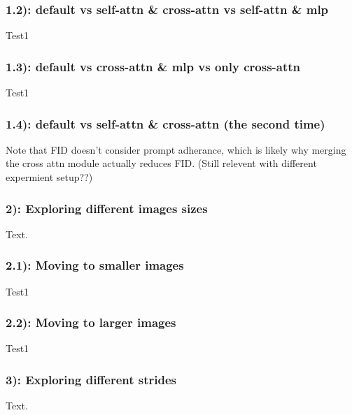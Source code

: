\newpage
\begin{figure}
    
    
    
    
\end{figure}
\subsubsection*{1.2): default vs self-attn \& cross-attn vs self-attn \& mlp}
Test1

\subsubsection*{1.3): default vs cross-attn \& mlp vs only cross-attn}
Test1

\newpage
\begin{figure}
    
    
\end{figure}
\subsubsection*{1.4): default vs self-attn \& cross-attn (the second time)}
Note that FID doesn’t consider prompt adherance, which is likely why merging the cross attn module actually reduces FID\cite{bolya2023tomesd}. (Still relevent with different expermient setup??)

\newpage
\begin{figure}
    
    
\end{figure}
\subsubsection*{2): Exploring different images sizes}
Text.
\subsubsection*{2.1): Moving to smaller images}
Test1

\newpage
\subsubsection*{2.2): Moving to larger images}
Test1

\newpage
\begin{figure}
    
    
\end{figure}
\subsubsection*{3): Exploring different strides}
Text.
